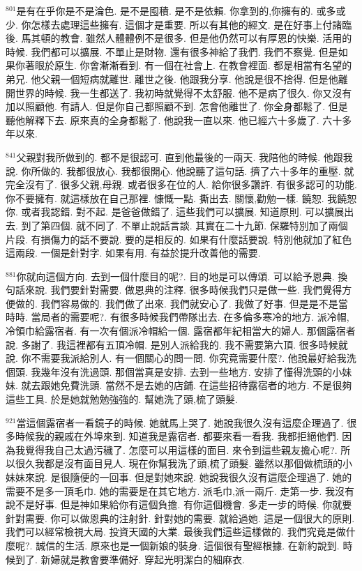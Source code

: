 \documentclass{book}
\begin{document}
$^{801}$是有在乎你是不是淪色.
是不是囤積.
是不是依賴.
你拿到的,你擁有的.
或多或少.
你怎樣去處理這些擁有.
這個才是重要.
所以有其他的經文.
是在好事上付諸臨後.
馬其頓的教會.
雖然人體體例不是很多.
但是他仍然可以有厚恩的快樂.
活用的時候.
我們都可以擴展.
不單止是財物.
還有很多神給了我們.
我們不察覺.
但是如果你著眼於原生.
你會漸漸看到.
有一個在社會上.
在教會裡面.
都是相當有名望的弟兄.
他父親一個短病就離世.
離世之後.
他跟我分享.
他說是很不捨得.
但是他離開世界的時候.
我一生都送了.
我初時就覺得不太舒服.
他不是病了很久.
你又沒有加以照顧他.
有請人.
但是你自己都照顧不到.
怎會他離世了.
你全身都鬆了.
但是聽他解釋下去.
原來真的全身都鬆了.
他說我一直以來.
他已經六十多歲了.
六十多年以來.

$^{841}$父親對我所做到的.
都不是很認可.
直到他最後的一兩天.
我陪他的時候.
他跟我說.
你所做的.
我都很放心.
我都很開心.
他說聽了這句話.
擠了六十多年的重壓.
就完全沒有了.
很多父親,母親.
或者很多在位的人.
給你很多讚許.
有很多認可的功能.
你不要擁有.
就這樣放在自己那裡.
慷慨一點.
撕出去.
關懷,勸勉一樣.
饒恕.
我饒恕你.
或者我認錯.
對不起.
是爸爸做錯了.
這些我們可以擴展.
知道原則.
可以擴展出去.
到了第四個.
就不同了.
不單止說話言談.
其實在二十九節.
保羅特別加了兩個片段.
有損傷力的話不要說.
要的是相反的.
如果有什麼話要說.
特別他就加了紅色這兩段.
一個是針對字.
如果有用.
有益於提升改善他的需要.

$^{881}$你就向這個方向.
去到一個什麼目的呢?.
目的地是可以傳頌.
可以給予恩典.
換句話來說.
我們要針對需要.
做恩典的注釋.
很多時候我們只是做一些.
我們覺得方便做的.
我們容易做的.
我們做了出來.
我們就安心了.
我做了好事.
但是是不是當時時.
當局者的需要呢?.
有很多時候我們帶隊出去.
在多倫多寒冷的地方.
派冷帽,冷領巾給露宿者.
有一次有個派冷帽給一個.
露宿都年紀相當大的婦人.
那個露宿者說.
多謝了.
我這裡都有五頂冷帽.
是別人派給我的.
我不需要第六頂.
很多時候就說.
你不需要我派給別人.
有一個關心的問一問.
你究竟需要什麼?.
他說最好給我洗個頭.
我幾年沒有洗過頭.
那個當真是安排.
去到一些地方.
安排了懂得洗頭的小妹妹.
就去跟她免費洗頭.
當然不是去她的店鋪.
在這些招待露宿者的地方.
不是很夠這些工具.
於是她就勉勉強強的.
幫她洗了頭,梳了頭髮.

$^{921}$當這個露宿者一看鏡子的時候.
她就馬上哭了.
她說我很久沒有這麼企理過了.
很多時候我的親戚在外埠來到.
知道我是露宿者.
都要來看一看我.
我都拒絕他們.
因為我覺得我自己太過污穢了.
怎麼可以用這樣的面目.
來令到這些親友擔心呢?.
所以很久我都是沒有面目見人.
現在你幫我洗了頭,梳了頭髮.
雖然以那個做梳頭的小妹妹來說.
是很隨便的一回事.
但是對她來說.
她說我很久沒有這麼企理過了.
她的需要不是多一頂毛巾.
她的需要是在其它地方.
派毛巾,派一兩斤.
走第一步.
我沒有說不是好事.
但是神如果給你有這個負擔.
有你這個機會.
多走一步的時候.
你就要針對需要.
你可以做恩典的注射針.
針對她的需要.
就給過她.
這是一個很大的原則.
我們可以經常檢視大局.
投資天國的大業.
最後我們這些這樣做的.
我們究竟是做什麼呢?.
誠信的生活.
原來也是一個新娘的裝身.
這個很有聖經根據.
在新約說到.
時候到了.
新婦就是教會要準備好.
穿起光明潔白的細麻衣.
\end{document}
